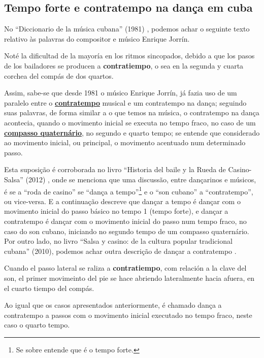 \subsection{Tempo forte e contratempo na dança em cuba}
\label{subsec:contratempocuba}
No ``Diccionario de la música cubana'' (1981) 
\cite[pp. 113]{orovio1981diccionario} \cite[pp. 57]{santana2005merengue},
podemos achar o seguinte texto relativo às palavras do compositor e músico Enrique Jorrín.
\begin{citando}
Noté la dificultad de la mayoría en los ritmos sincopados, 
debido a que los pasos de los bailadores se producen a \textbf{contratiempo},
o sea en la segunda y cuarta corchea del compás de dos quartos.
\end{citando}
Assim, sabe-se que desde 1981 o músico Enrique Jorrín, 
já fazia uso de um paralelo entre o \hyperref[sec:contratempo]{\textbf{contratempo}} 
musical e um contratempo na dança;
seguindo suas palavras, de forma similar a o que temos na música, o contratempo na dança acontecia,
quando o movimento inicial se executa no tempo fraco, 
no caso de um \hyperref[subsec:compassoquaternario]{\textbf{compasso quaternário}},
no segundo e quarto tempo;
se entende que considerado ao movimento inicial, ou principal, o movimento acentuado num determinado passo.

Esta suposição é corroborada no livro ``Historia del baile y la Rueda de Casino-Salsa'' (2012) \cite{borges2012historia},
onde se menciona que uma discussão, entre dançarinos e músicos,
é se a ``roda de casino'' se ``dança a tempo''\footnote{Se sobre entende que é o tempo forte.} 
e o ``son cubano'' a ``contratempo'',
ou vice-versa. E a continuação descreve que dançar a tempo
é dançar com o movimento inicial do passo básico no tempo 1 (tempo forte),
e dançar a contratempo é dançar com o movimento inicial do passo num tempo fraco, 
no caso do son cubano, iniciando no segundo tempo de um compasso quaternário.
Por outro lado, no livro ``Salsa y casino: de la cultura popular tradicional cubana'' (2010),
podemos achar outra descrição de dançar a contratempo \cite[pp. 63]{gutierrez2010salsa}.
\begin{citando}
Cuando el passo lateral se raliza a \textbf{contratiempo},
com relación a la clave del son,
el primer movimeinto del pie se hace abriendo lateralmente hacia afuera,
en el cuarto tiempo del compás.
\end{citando}
Ao igual que os casos apresentados anteriormente,
é chamado dança a contratempo a passos com o movimento inicial  executado no tempo fraco,
neste caso o quarto tempo.

